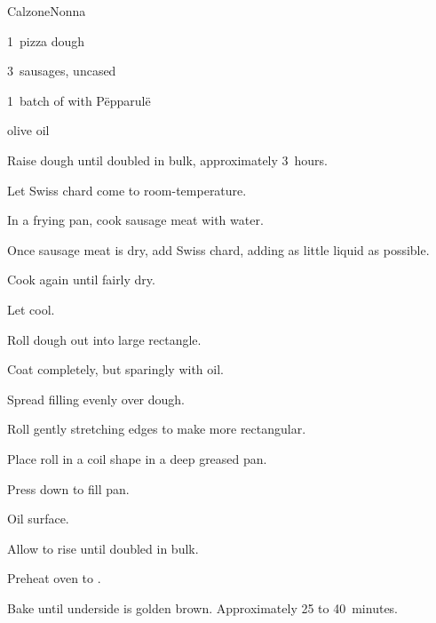 \begin{recipe}{Calzone}{Nonna}{}

\begin{ingredients}
\item 1~pizza dough
\item 3~sausages, uncased
\item 1~batch of  with P\"epparul\"e
\item olive oil
\end{ingredients}

\begin{directions}
\item Raise dough until doubled in bulk, approximately 3~hours.
\item Let Swiss chard come to room-temperature.
\item In a frying pan, cook sausage meat with \C{\quarter} water.
\item Once sausage meat is dry, add Swiss chard, adding as little liquid as possible.
\item Cook again until fairly dry.
\item Let cool.
\item Roll dough out into large rectangle.
\item Coat completely, but sparingly with oil.
\item Spread filling evenly over dough.
\item Roll gently stretching edges to make more rectangular.
\item Place roll in a coil shape in a deep greased pan.
\item Press down to fill pan.
\item Oil surface.
\item Allow to rise until doubled in bulk.
\item Preheat oven to .
\item Bake until underside is golden brown. Approximately 25 to 40~minutes.
\end{directions}

\end{recipe}
